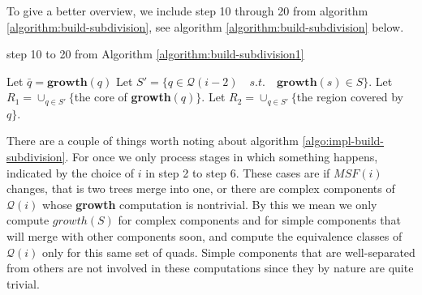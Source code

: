 To give a better overview, we include step 10 through 20 from algorithm \ref{algorithm:build-subdivision}, 
see algorithm \ref{algorithm:build-subdivision} below.

\begin{algorithm}[H]
	\caption{step 10 to 20 from Algorithm \ref{algorithm:build-subdivision1}}  
	\begin{algorithmic}[1]
            \State Let $\bar{q} = \mathbf{growth}(q)$
                \State {}
            \EndIf
        \EndFor
            \State Let $S'=\{q\in\mathcal{Q}(i-2) \quad s.t. \quad 
            \mathbf{growth}(s)\in S\}$.
                \State Let $R_1 = \cup_{q\in S'} \{$the core of 
                \textbf{growth}$(q)\}.$
                \State Let $R_2 = \cup_{q\in S'} \{$the region covered by 
                $q\}.$
                \State {}
                \State {}
            \EndIf
        \EndFor
	\end{algorithmic} 
\end{algorithm}


There are a couple of things worth noting about algorithm \ref{algo:impl-build-subdivision}. For once 
we only process stages in which something happens, indicated by the choice of $i$ in step 2 to step 6. 
These cases are if $MSF(i)$ changes, that is two trees merge into one, or there are complex components 
of $\mathcal{Q}(i)$ whose \textbf{growth} computation is nontrivial. By this we mean we only compute 
$growth(S)$ for complex components and for simple components that will merge with other components soon, 
and compute the equivalence classes of $\mathcal{Q}(i)$ only for this same set of quads. Simple 
components that are well-separated from others are not involved in these computations since they by 
nature are quite trivial. 

